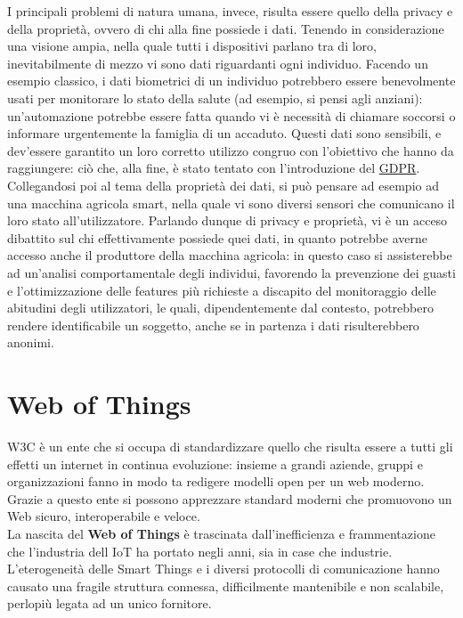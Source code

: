 \documentclass[12pt,a4paper,openright,oneside]{report}
\begin{document}
I principali problemi di natura umana, invece, risulta essere quello della privacy e della proprietà, ovvero di chi alla fine possiede i dati. Tenendo in considerazione una visione ampia, nella quale tutti i dispositivi parlano tra di loro, inevitabilmente di mezzo vi sono dati riguardanti ogni individuo. Facendo un esempio classico, i dati biometrici di un individuo potrebbero essere benevolmente usati per monitorare lo stato della salute (ad esempio, si pensi agli anziani): un'automazione potrebbe essere fatta quando vi è necessità di chiamare soccorsi o informare urgentemente la famiglia di un accaduto. Questi dati sono sensibili, e dev'essere garantito un loro corretto utilizzo congruo con l'obiettivo che hanno da raggiungere: ciò che, alla fine, è stato tentato con l'introduzione del  \href{https://eur-lex.europa.eu/legal-content/IT/TXT/?uri=uriserv:OJ.L_.2016.119.01.0001.01.ITA&toc=OJ:L:2016:119:TOC}{GDPR}.\\

Collegandosi poi al tema della proprietà dei dati, si può pensare ad esempio ad una macchina agricola smart, nella quale vi sono diversi sensori che comunicano il loro stato all'utilizzatore. Parlando dunque di privacy e proprietà, vi è un acceso dibattito sul chi effettivamente possiede quei dati, in quanto potrebbe averne accesso anche il produttore della macchina agricola: in questo caso si assisterebbe ad un'analisi comportamentale degli individui, favorendo la prevenzione dei guasti e l'ottimizzazione delle features più richieste a discapito del monitoraggio delle abitudini degli utilizzatori, le quali, dipendentemente dal contesto, potrebbero rendere identificabile un soggetto, anche se in partenza i dati risulterebbero anonimi.\\


\section{Web of Things}
\label{sec:w3c}
\label{sec:wot}
W3C {\cite{w3c}} è un ente che si occupa di standardizzare quello che risulta essere a tutti gli effetti un internet in continua evoluzione: insieme a grandi aziende, gruppi e organizzazioni fanno in modo ta redigere modelli open per un web moderno. Grazie a questo ente si possono apprezzare standard moderni che promuovono un Web sicuro, interoperabile e veloce.\\

La nascita del \textbf{Web of Things} \cite{wot} è trascinata dall'inefficienza e frammentazione che l'industria dell IoT ha portato negli anni, sia in case che industrie. L'eterogeneità delle Smart Things e i diversi protocolli di comunicazione hanno causato una fragile struttura connessa, difficilmente mantenibile e non scalabile, perlopiù legata ad un unico fornitore.\\
\end{document}
